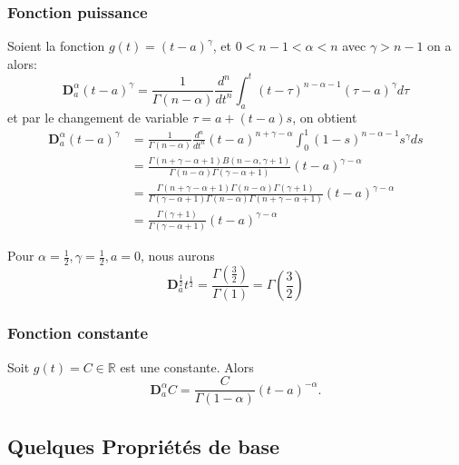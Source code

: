 \subsubsection*{Fonction puissance} 
Soient la fonction $g(t)=(t-a)^\gamma$, et $0<n-1<\alpha<n$ avec $\gamma > n-1$ on a alors: 
\begin{equation*}
    \textbf{D}_a^{\alpha} (t-a)^{\gamma} = \frac{1}{\Gamma(n-\alpha)} \frac{d^n}{dt^n} \int_a^t(t-\tau)^{n-\alpha-1} (\tau -a)^{\gamma} d\tau
\end{equation*}
    et par le changement de variable $\tau = a + (t-a)s$, on obtient
    \begin{align*}
         \textbf{D}_a^{\alpha} (t-a)^{\gamma} &= \frac{1}{\Gamma(n- \alpha)} \frac{d^n}{dt^n} (t-a)^{n+\gamma-\alpha} \int_0^1 (1-s)^{n-\alpha -1} s^{\gamma}ds\\
         &= \frac{\Gamma(n+\gamma-\alpha+1)B(n-\alpha,\gamma+1)}{\Gamma(n-\alpha)\Gamma(\gamma-\alpha +1)}(t-a)^{\gamma-\alpha}\\
         &= \frac{\Gamma(n+\gamma-\alpha+1)\Gamma(n-\alpha)\Gamma(\gamma +1)}{\Gamma(\gamma-\alpha +1)\Gamma(n-\alpha)\Gamma(n+\gamma-\alpha+1)}(t-a)^{\gamma-\alpha}\\
         &= \frac{\Gamma(\gamma+1)}{\Gamma(\gamma - \alpha +1)}(t-a)^{\gamma - \alpha}
\end{align*}
\begin{exemple}
Pour $\alpha = \frac{1}{2}, \gamma=\frac{1}{2}, a= 0$, nous aurons
\begin{equation*}
    \textbf{D}_a^{\frac{1}{2}} t^{\frac{1}{2}} = \frac{\Gamma(\frac{3}{2})}{\Gamma(1)}= \Gamma(\frac{3}{2}) 
\end{equation*}
\end{exemple}
\subsubsection*{Fonction constante} 
Soit $g(t) =C \in \mathbb{R}$ est une constante. Alors 
\begin{equation}
    \textbf{D}_a^{\alpha} C=\frac{C}{\Gamma(1-\alpha)}(t-a)^{-\alpha}.
\end{equation}
\subsection{Quelques Propriétés de base} 




